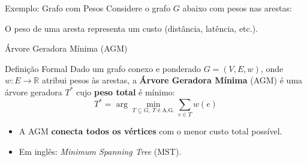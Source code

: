 \documentclass[9pt]{beamer}
\begin{document}
\begin{frame}{Exemplo: Grafo com Pesos}
    Considere o grafo $G$ abaixo com pesos nas arestas:
    \vspace{0.3cm}
    \begin{center}
    \end{center}
    \vspace{0.2cm}
    O peso de uma aresta representa um custo (distância, latência, etc.).
\end{frame}

\begin{frame}{Árvore Geradora Mínima (AGM)}
    \begin{block}{Definição Formal}
        Dado um grafo conexo e ponderado $G = (V, E, w)$, onde $w: E \to \mathbb{R}$ atribui pesos às arestas, a \textbf{Árvore Geradora Mínima} (AGM) é uma árvore geradora $T^*$ cujo \textbf{peso total} é mínimo:
        \[
            T^* = \arg\min_{T \subseteq G,\ T \text{ é A.G.}} \sum_{e \in T} w(e)
        \]
    \end{block}
    \vspace{0.3cm}
    \begin{itemize}
        \item A AGM \textbf{conecta todos os vértices} com o menor custo total possível.
        \item Em inglês: \textit{Minimum Spanning Tree} (MST).
    \end{itemize}
\end{frame}
\end{document}
